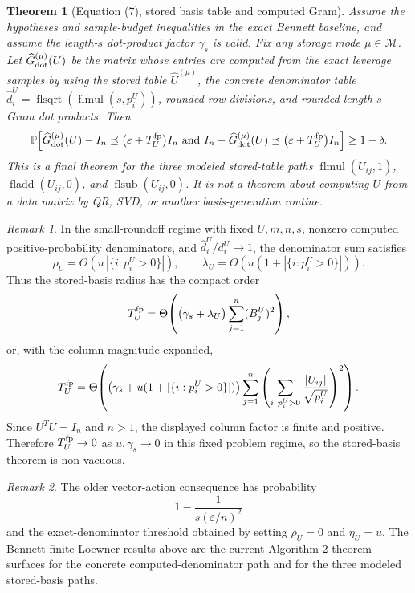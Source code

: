 \documentclass[11pt]{article}
\newcommand{\Prob}{\mathbb{P}}
\newcommand{\Ghat}{\widehat G}
\newcommand{\I}{I}
\newcommand{\eps}{\varepsilon}
\newtheorem{theorem}{Theorem}
\theoremstyle{remark}
\newtheorem*{remark}{Remark}
\begin{document}
\begin{theorem}[Equation (7), stored basis table and computed Gram]
Assume the hypotheses and sample-budget inequalities in the exact Bennett
baseline, and assume the length-\(s\) dot-product factor \(\gamma_s\) is valid.
Fix any storage mode \(\mu\in\mathcal M\).  Let
\(\Ghat_{\rm dot}^{(\mu)}(U)\) be the matrix whose entries are computed from
the exact leverage samples by using the stored table
\(\widehat U^{(\mu)}\), the concrete denominator table
\(\widehat d_i^U=\operatorname{flsqrt}(\operatorname{flmul}(s,p_i^U))\),
rounded row divisions, and rounded length-\(s\) Gram dot products.  Then
\[
  \Prob\!\left[
    \Ghat_{\rm dot}^{(\mu)}(U)-\I_n
      \preceq
      \bigl(\eps+T_U^{\rm fp}\bigr)\I_n
    \ \hbox{and}\
    \I_n-\Ghat_{\rm dot}^{(\mu)}(U)
      \preceq
      \bigl(\eps+T_U^{\rm fp}\bigr)\I_n
  \right]\ge 1-\delta .
\]
This is a final theorem for the three modeled stored-table paths
\(\operatorname{flmul}(U_{ij},1)\), \(\operatorname{fladd}(U_{ij},0)\), and
\(\operatorname{flsub}(U_{ij},0)\).  It is not a theorem about computing \(U\)
from a data matrix by QR, SVD, or another basis-generation routine.
\end{theorem}

\begin{remark}
In the small-roundoff regime with fixed \(U,m,n,s\), nonzero computed
positive-probability denominators, and
\(\widehat d_i^U/d_i^U\to1\), the denominator sum satisfies
\[
  \rho_U=\Theta\!\left(u\,|\{i:p_i^U>0\}|\right),
  \qquad
  \lambda_U=\Theta\!\left(u(1+|\{i:p_i^U>0\}|)\right).
\]
Thus the stored-basis radius has the compact order
\[
  T_U^{\rm fp}
  =
  \Theta\!\left(
    \bigl(\gamma_s+\lambda_U\bigr)
    \sum_{j=1}^n (B_j^U)^2
  \right),
\]
or, with the column magnitude expanded,
\[
  T_U^{\rm fp}
  =
  \Theta\!\left(
    \left(\gamma_s+u(1+|\{i:p_i^U>0\}|)\right)
    \sum_{j=1}^n
    \left(
      \sum_{i:\,p_i^U>0}\frac{|U_{ij}|}{\sqrt{p_i^U}}
    \right)^2
  \right).
\]
Since \(U^TU=I_n\) and \(n>1\), the displayed column factor is finite and
positive.  Therefore \(T_U^{\rm fp}\to0\) as \(u,\gamma_s\to0\) in this fixed
problem regime, so the stored-basis theorem is non-vacuous.
\end{remark}

\begin{remark}
The older vector-action consequence has probability
\[
  1-\frac{1}{s(\eps/n)^2}
\]
and the exact-denominator threshold
obtained by setting \(\rho_U=0\) and \(\eta_U=u\).  The Bennett
finite-Loewner results above are the current Algorithm 2 theorem surfaces for
the concrete computed-denominator path and for the three modeled stored-basis
paths.
\end{remark}
\end{document}

